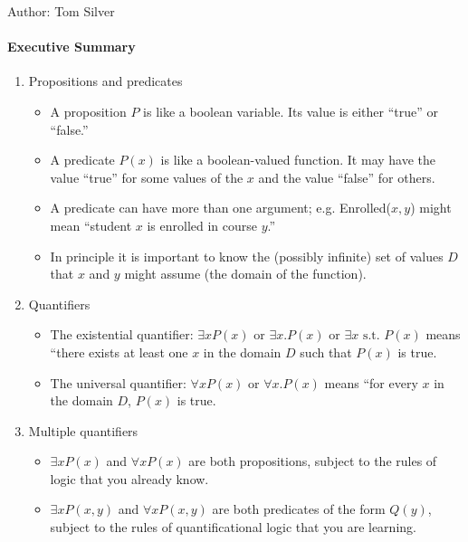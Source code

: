 \documentclass[solution, letterpaper]{cs20inclass}
\begin{document}

\noindent Author: Tom Silver%

\paragraph*{Executive Summary}
\begin{enumerate}

\item Propositions and predicates
\begin{itemize}

\item A proposition $P$ is like a boolean variable. Its value is either ``true'' or ``false.''
\item A predicate $P(x)$ is like a boolean-valued function. It may have the value ``true'' for some values of the $x$ and the value ``false'' for others.
\item A predicate can have more than one argument; e.g. Enrolled($x, y$) might mean ``student $x$ is enrolled in course $y$.'' 
\item In principle it is important to know the (possibly infinite) set of values $D$ that $x$ and $y$ might assume (the domain of the function). 
\end{itemize}

\item Quantifiers
\begin{itemize}
\item The existential quantifier: $\exists x P(x)$ or $\exists x. P(x)$ or $\exists x \mbox{ s.t. }P(x)$ means ``there exists at least one $x$ in the domain $D$ such that $P(x)$ is true.

\item The universal quantifier: $\forall x P(x)$ or $\forall x. P(x)$  means ``for every $x$ in the domain $D$, $P(x)$ is true.

\end{itemize}

\item Multiple quantifiers
\begin{itemize}

\item  $\exists x P(x)$ and $\forall x P(x)$ are both propositions, subject to the rules of logic that you already know.

\item  $\exists x P(x,y)$ and $\forall x P(x,y)$ are both predicates of the form $Q(y)$, subject to the rules of quantificational logic that you are learning.


\end{itemize}
\end{enumerate}
\end{document}
